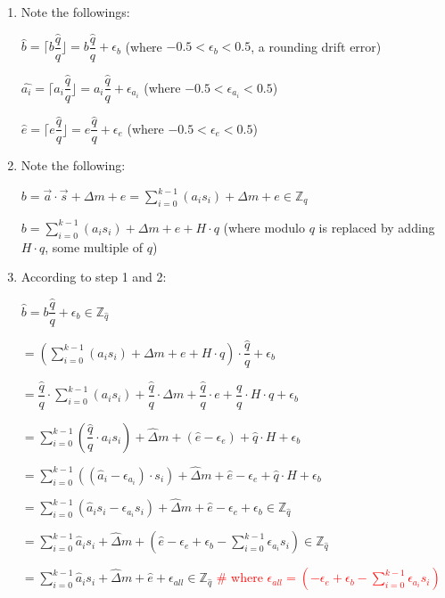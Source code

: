 \begin{myproof}
\begin{enumerate}
\item Note the followings: 

$\hat{b} = \Big\lceil b \dfrac{\hat{q}}{q} \Big\rfloor = b\dfrac{\hat{q}}{q} + \epsilon_b$ (where $-0.5 < \epsilon_b < 0.5$, a rounding drift error)

$\hat{a_i} = \Big\lceil a_i \dfrac{\hat{q}}{q} \Big\rfloor = a_i\dfrac{\hat{q}}{q} + \epsilon_{a_i}$ (where $-0.5 < \epsilon_{a_i} < 0.5$)

$\hat{e} = \Big\lceil e \dfrac{\hat{q}}{q} \Big\rfloor = e\dfrac{\hat{q}}{q} + \epsilon_e$ (where $-0.5 < \epsilon_e < 0.5$)
\item Note the following: 

$b = \vec{a} \cdot \vec{s} + \Delta  m + e = \sum\limits_{i=0}^{k-1}(a_is_i) + \Delta m + e  \in \mathbb{Z}_q$

$b = \sum\limits_{i=0}^{k-1}(a_is_i) + \Delta m + e + H \cdot q$ (where modulo $q$ is replaced by adding $H \cdot q$, some multiple of $q$)

\item According to step 1 and 2:

$\hat{b} = b\dfrac{\hat{q}}{q} + \epsilon_b \in \mathbb{Z}_{\hat{q}}$

$= \left(\sum\limits_{i=0}^{k-1}(a_is_i) + \Delta m + e + H \cdot q\right) \cdot \dfrac{\hat{q}}{q}  + \epsilon_b$

$= \dfrac{\hat{q}}{q} \cdot \sum\limits_{i=0}^{k-1}(a_is_i) + \dfrac{\hat{q}}{q} \cdot \Delta m + \dfrac{\hat{q}}{q} \cdot e + \dfrac{\hat{q}}{q} \cdot H \cdot q + \epsilon_b$

$= \sum\limits_{i=0}^{k-1}\left(\dfrac{\hat{q}}{q} \cdot a_is_i\right) + \hat{\Delta} m + (\hat{e} - \epsilon_e) + \hat{q}\cdot H + \epsilon_b$

$= \sum\limits_{i=0}^{k-1}\left((\hat{a}_i - \epsilon_{a_i}) \cdot s_i\right) + \hat{\Delta} m + \hat{e} - \epsilon_e + \hat{q}\cdot H + \epsilon_b$

$= \sum\limits_{i=0}^{k-1}(\hat{a}_is_i - \epsilon_{a_i}s_i) + \hat{\Delta} m + \hat{e} - \epsilon_e + \epsilon_b \in \mathbb{Z}_{\hat{q}}$

$= \sum\limits_{i=0}^{k-1}\hat{a}_is_i + \hat{\Delta} m + \left( \hat{e} - \epsilon_e + \epsilon_b - \sum\limits_{i=0}^{k-1}\epsilon_{a_i}s_i \right) \in \mathbb{Z}_{\hat{q}}$

$= \sum\limits_{i=0}^{k-1}\hat{a}_is_i + \hat{\Delta} m + \hat{e} + \epsilon_{\textit{all}} \in \mathbb{Z}_{\hat{q}}$ \textcolor{red}{\#  where $\epsilon_{\textit{all}} = \left(- \epsilon_e + \epsilon_b - \sum\limits_{i=0}^{k-1}\epsilon_{a_i}s_i \right)$}


\end{enumerate}
\end{myproof}
